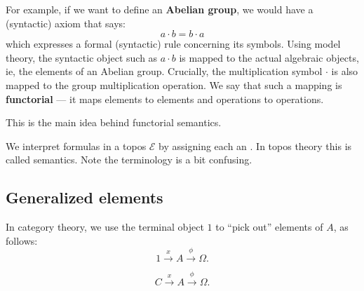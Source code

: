 For example, if we want to define an \textbf{Abelian group}, we would have a (syntactic) axiom that says:
\begin{equation}
a \cdot b = b \cdot a
\end{equation}
which expresses a formal (syntactic) rule concerning its symbols.  Using model theory, the syntactic object such as $a \cdot b$ is mapped to the actual algebraic objects, ie, the elements of an Abelian group.  Crucially, the multiplication symbol $\cdot$ is also mapped to the group multiplication operation.  We say that such a mapping is \textbf{functorial} --- it maps elements to elements and operations to operations.

This is the main idea behind functorial semantics.

We interpret formulas in a topos $\mathcal{E}$ by assigning each an .  In topos theory this is called  semantics.  Note the terminology is a bit confusing.

\subsection{Generalized elements}


In category theory, we use the terminal object $1$ to ``pick out'' elements of $A$, as follows:
\begin{equation}
1 \stackrel{x}{\rightarrow} A \stackrel{\phi}{\rightarrow} \Omega.
\end{equation}

\begin{equation}
C \stackrel{x}{\rightarrow} A \stackrel{\phi}{\rightarrow} \Omega.
\end{equation}

